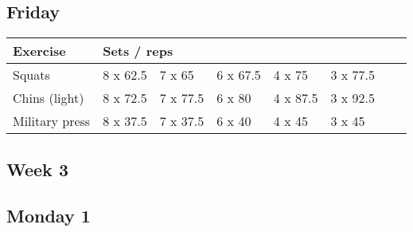 \documentclass[12pt, a4paper]{article}%
\begin{document}
  \subsection*{\hspace{0.5em} Friday }


  \begin{tabular}{l|lllllll}
  \hspace{0.75em} \textbf{Exercise} & \multicolumn{ 7 }{l}{ \textbf{Sets / reps} } \\ \hline

            \hspace{0.75em} Squats
            & 8 x 62.5
            & 7 x 65
            & 6 x 67.5
            & 4 x 75
            & 3 x 77.5
            & 
            & 
            \\


            \hspace{0.75em} Chins (light)
            & 8 x 72.5
            & 7 x 77.5
            & 6 x 80
            & 4 x 87.5
            & 3 x 92.5
            & 
            & 
            \\


            \hspace{0.75em} Military press
            & 8 x 37.5
            & 7 x 37.5
            & 6 x 40
            & 4 x 45
            & 3 x 45
            & 
            & 
            \\


  \end{tabular}


\clearpage \subsection*{\hspace{0.25em} Week 3 }
  \subsection*{\hspace{0.5em} Monday 1 }
\end{document}
